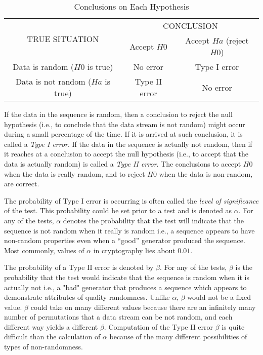 \begin{table}[h!]
\centering
    \begin{tabular}{ |c|c|c| } 
        \hline
        \multirow{2}{*}{TRUE SITUATION} & \multicolumn{2}{|c|}{CONCLUSION} \\
        \cline{2-3}
        & Accept $H0$ & Accept $Ha$ (reject $H0$) \\
        \hline
        Data is random ($H0$ is true) & No error & Type I error \\
        \hline
        Data is not random ($Ha$ is true) & Type II error & No error \\
        \hline
    \end{tabular}
    \caption{Conclusions on Each Hypothesis\cite{rep_nist_sp_80022}}
    \label{tbl_hypothesis}
\end{table}

If the data in the sequence is random, then a conclusion to reject the null hypothesis (i.e., to conclude that the data stream is not random) might occur during a small percentage of the time. If it is arrived at such conclusion, it is called a \textit{Type I error}. If the data in the sequence is actually not random, then if it reaches at a conclusion to accept the null hypothesis (i.e., to accept that the data is actually random) is called a \textit{Type II error}. The conclusions to accept $H0$ when the data is really random, and to reject $H0$ when the data is non-random, are correct.

The probability of Type I error is occurring is often called the \textit{level of significance} of the test. This probability could be set prior to a test and is denoted as $\alpha$. For any of the tests, $\alpha$ denotes the probability that the test will indicate that the sequence is not random when it really is random i.e., a sequence appears to have non-random properties even when a “good” generator produced the sequence. Most commonly, values of $\alpha$ in cryptography lies about $0.01$.

The probability of a Type II error is denoted by $\beta$. For any of the tests, $\beta$ is the probability that the test would indicate that the sequence is random when it is actually not i.e., a "bad" generator that produces a sequence which appears to demonstrate attributes of quality randomness. Unlike $\alpha$, $\beta$ would not be a fixed value. $\beta$ could take on many different values because there are an infinitely many number of permutations that a data stream can be not random, and each different way yields a different $\beta$. Computation of the Type II error $\beta$ is quite difficult than the calculation of $\alpha$ because of the many different possibilities of types of non-randomness.

